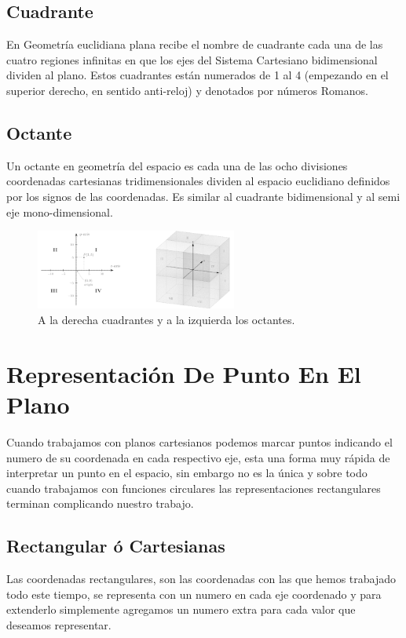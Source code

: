 \documentclass{article}
\begin{document}
\subsection{Cuadrante}
\label{sec:orgc69838b}
En Geometría euclidiana plana recibe el nombre de cuadrante cada una de las cuatro regiones infinitas en que los ejes del Sistema Cartesiano bidimensional dividen al plano. Estos cuadrantes están numerados de 1 al 4 (empezando en el superior derecho, en sentido anti-reloj) y denotados por números Romanos.

\subsection{Octante}
\label{sec:orgdb84500}
Un octante en geometría del espacio es cada una de las ocho divisiones coordenadas cartesianas tridimensionales dividen al espacio euclidiano definidos por los signos de las coordenadas. Es similar al cuadrante bidimensional y al semi eje mono-dimensional.

\begin{figure}[htbp]
\centering
\includegraphics[width=250px]{img/cuadrante-y-octante-2.png}
\caption{A la derecha cuadrantes y a la izquierda los octantes.}
\end{figure}

\section{Representación De Punto En El Plano}
\label{sec:org4d2e496}
Cuando trabajamos con planos cartesianos podemos marcar puntos indicando el numero de su coordenada en cada respectivo eje, esta una forma muy rápida de interpretar un punto en el espacio, sin embargo no es la única y sobre todo cuando trabajamos con funciones circulares las representaciones rectangulares terminan complicando nuestro trabajo.

\subsection{Rectangular ó Cartesianas}
\label{sec:org052e368}
Las coordenadas rectangulares, son las coordenadas con las que hemos trabajado todo este tiempo, se representa con un numero en cada eje coordenado y para extenderlo simplemente agregamos un numero extra para cada valor que deseamos representar. 
\end{document}
